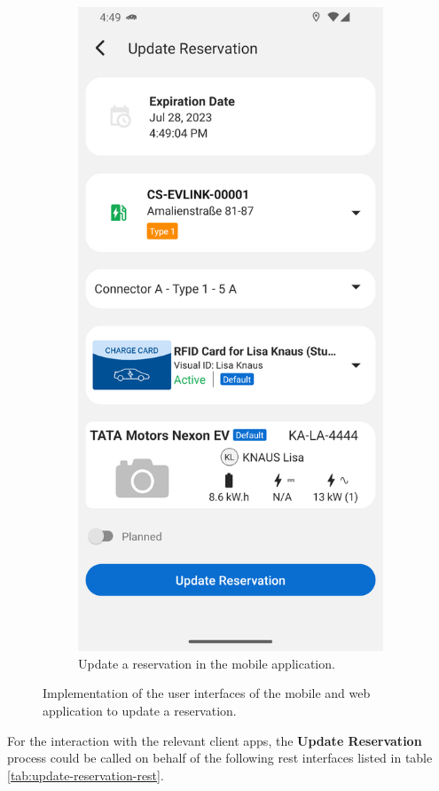 \begin{figure}[h]
\begin{subfigure}[c]{0.3\textwidth}
         \includegraphics[width=\textwidth,height=1.6\textwidth,keepaspectratio]{resources/images/main/6_implementation/screens/update_reservation/mobile/Update_Reservation.png}
         \caption{Update a reservation in the mobile application.}
         \label{fig:mobile-update-reservation-impl}
    \end{subfigure}
    \caption{Implementation of the user interfaces of the mobile and web application to update a reservation.}
    \label{fig:impl-update-reservation}
\end{figure}

\noindent For the interaction with the relevant client apps, the \textbf{Update Reservation} process could be called on behalf of the following \acrshort{rest} interfaces listed in table \ref{tab:update-reservation-rest}.

